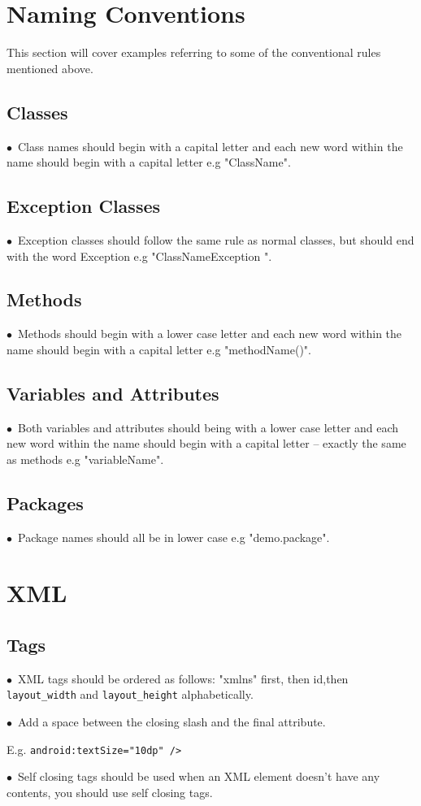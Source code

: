 \documentclass[english]{article}
\begin{document}
				
\section{Naming Conventions	}
This section will cover examples referring to some of the conventional rules mentioned above.
				
\subsection{ Classes }
$\bullet$\ Class names should begin with a capital letter and each new word within the name should begin with a capital letter e.g "ClassName".\par

\subsection{Exception Classes}
$\bullet$\ Exception classes should follow the same rule as normal classes, but should end with the word Exception e.g "ClassNameException ".\par
\subsection{Methods}
$\bullet$\ Methods should begin with a lower case letter and each new word within the name should begin with a capital letter e.g "methodName()".\par

\subsection{Variables and Attributes }
$\bullet$\ Both variables and attributes should being with a lower case letter and each new word within the name should begin with a capital letter – exactly the same as methods e.g "variableName".\par
\subsection{Packages}
$\bullet$\ Package names should all be in lower case e.g "demo.package".\par

	\section{XML	}
	
	\subsection{Tags}
$\bullet$\ XML tags should be ordered as follows: "xmlns" first, then id,then  \texttt{layout\_width} and  \texttt{layout\_height} alphabetically. \par
$\bullet$\ Add a space between the closing slash and the final attribute.\par E.g.  \texttt{android:textSize="10dp" /> }\par
$\bullet$\ Self closing tags should be used when an XML element doesn't have any contents, you should use self closing tags. \par
\end{document}
